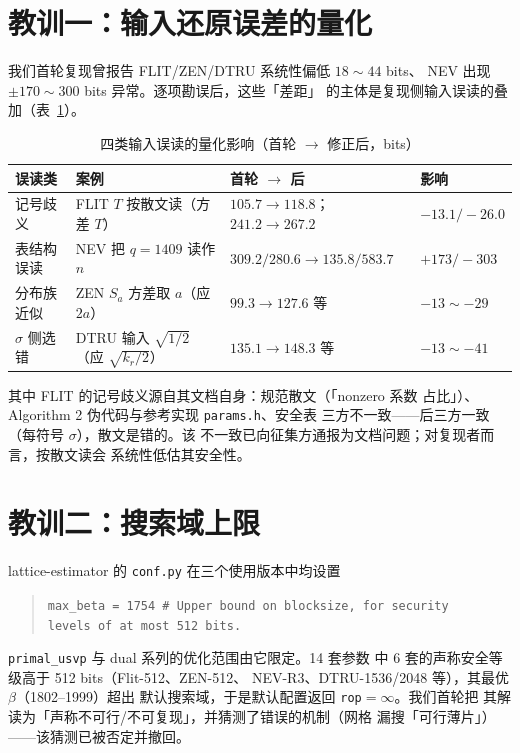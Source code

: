 \documentclass[11pt,a4paper,zihao=-4]{ctexart}
\newcommand{\code}[1]{\texttt{#1}}
\begin{document}
\section{教训一：输入还原误差的量化}\label{sec:l1}

我们首轮复现曾报告 FLIT/ZEN/DTRU 系统性偏低 $18\sim44$ bits、
NEV 出现 $\pm 170\sim 300$ bits 异常。逐项勘误后，这些「差距」
的主体是复现侧输入误读的叠加（表~\ref{tab:sens}）。

\begin{table}[htbp]\centering\small
\caption{四类输入误读的量化影响（首轮 $\to$ 修正后，bits）}\label{tab:sens}
\begin{tabular}{@{}llll@{}}
\toprule
误读类 & 案例 & 首轮 $\to$ 后 & 影响 \\
\midrule
记号歧义 & FLIT $T$ 按散文读（方差 $T$） & $105.7 \to 118.8$；$241.2 \to 267.2$ & $-13.1/-26.0$ \\
表结构误读 & NEV 把 $q{=}1409$ 读作 $n$ & $309.2/280.6 \to 135.8/583.7$ & $+173/-303$ \\
分布族近似 & ZEN $S_a$ 方差取 $a$（应 $2a$） & $99.3 \to 127.6$ 等 & $-13 \sim -29$ \\
$\sigma$ 侧选错 & DTRU 输入 $\sqrt{1/2}$（应 $\sqrt{k_r/2}$） & $135.1 \to 148.3$ 等 & $-13 \sim -41$ \\
\bottomrule
\end{tabular}
\end{table}

其中 FLIT 的记号歧义源自其文档自身：规范散文（「nonzero 系数
占比」）、Algorithm 2 伪代码与参考实现 \code{params.h}、安全表
三方不一致——后三方一致（每符号 $\sigma$），散文是错的。该
不一致已向征集方通报为文档问题；对复现者而言，按散文读会
系统性低估其安全性。

\section{教训二：搜索域上限}\label{sec:l2}

lattice-estimator 的 \code{conf.py} 在三个使用版本中均设置
\begin{quote}\small
\code{max\_beta = 1754 \# Upper bound on blocksize, for security\\
levels of at most 512 bits.}
\end{quote}
\code{primal\_usvp} 与 dual 系列的优化范围由它限定。14 套参数
中 6 套的声称安全等级高于 512 bits（Flit-512、ZEN-512、
NEV-R3、DTRU-1536/2048 等），其最优 $\beta$（1802--1999）超出
默认搜索域，于是默认配置返回 \code{rop}$=\infty$。我们首轮把
其解读为「声称不可行/不可复现」，并猜测了错误的机制（网格
漏搜「可行薄片」）——该猜测已被否定并撤回。
\end{document}
